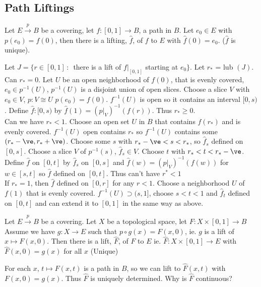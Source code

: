 
\subsection{Path Liftings}

\begin{lemma}
    Let $E \stackrel{p}{\to} B$ be a covering, let $f: [0,1] \to B$, a path in $B$. Let $e_0 \in E$ with $p(e_0) = f(0)$, then there is a lifting, $\hat{f}$, of $f$ to $E$ with $\hat{f}(0) = e_0$. ($\hat{f}$ is unique). 
\end{lemma}

\begin{pf}
    Let $J = \{ r \in [0,1] \, : \,$ there is a lift of $f|_{[0,1]}$ starting at $e_0 \}$. Let $r_*$ = lub $(J)$. Can $r_*=0$. Let $U$ be an open neighborhood of $f(0)$, that is evenly covered, $e_0 \in p^{-1}(U)$, $p^{-1}(U)$ is a disjoint union of open slices. Choose a slice $V$ with $e_0 \in V$, $p: V \cong U$ $p(e_0) = f(0)$. $f^{-1}(U)$ is open so it contains an interval $[0,s)$. Define $\hat{f}: [0,s)$ by $\hat{f}(1) = (p|_V)^{-1}(f(r))$. Thus $r_* \ge 0$. \\
    Can we have $r_* < 1$. Choose an open set $U$ in $B$ that contains $f(r_*)$ and is evenly covered. $f^{-1}(U)$ open contains $r_*$ so $f^{-1}(U)$ contains some $(r_* - \ve, r_* + \ve)$. Choose some $s$ with $r_* - \ve < s < r_*$, so $\hat{f}_s$ defined on $[0,s]$. Choose a slice $V$ of $p^{-1}(s)$, $\hat{f}_s \in V$. Choose $t$ with $r_* < t < r_* - \ve$. Define $\hat{f}$ on $[0,t]$ by $\hat{f}_s$ on $[0,s]$ and $\hat{f}(w) = (p|_V)^{-1}(f(w))$ for $w \in [s,t]$ so $\hat{f}$ defined on $[0,t]$. Thus can't have $r^* < 1$ \\
    If $r_* = 1$, then $\hat{f}$ defined on $[0,r]$ for any $r < 1$. Choose a neighborhood $U$ of $f(1)$ that is evenly covered. $f^{-1}(U) \supset (s,1]$, choose $s < t < 1$ and $\hat{f}_{t}$ defined on $[0,t]$ and can extend it to $[0,1]$ in the same way as above. 
\end{pf}

\begin{theorem}
    Let $E \stackrel{p}{\to} B$ be a covering. Let $X$ be a topological space, let $F: X \times [0,1] \to B$ Assume we have $g: X \to E$ such that $p \circ g(x) = F(x,0)$, ie. $g$ is a lift of $x \mapsto F(x,0)$. Then there is a lift, $\hat{F}$, of $F$ to $E$ ie. $\hat{F}: X \times [0,1] \to E$ with $\hat{F}(x,0) = g(x)$ for all $x$ (Unique)
\end{theorem}

\begin{pf}
    For each $x$, $t \mapsto F(x,t)$ is a path in $B$, so we can lift to $\hat{F}(x,t)$ with $F(x,0) = g(x)$. Thus $\hat{F}$ is uniquely determined. Why is $\hat{F}$ continuous?  
\end{pf}